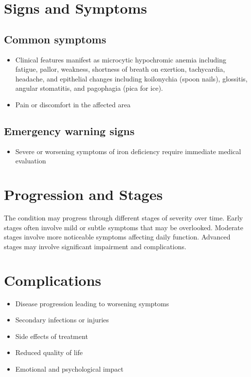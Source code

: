 \section{Signs and Symptoms}

\subsection{Common symptoms}
\begin{itemize}[noitemsep]
  \item Clinical features manifest as microcytic hypochromic anemia including fatigue, pallor, weakness, shortness of breath on exertion, tachycardia, headache, and epithelial changes including koilonychia (spoon nails), glossitis, angular stomatitis, and pagophagia (pica for ice).

  \item Pain or discomfort in the affected area
  \end{itemize}

\subsection{Emergency warning signs}
\begin{itemize}[noitemsep]
  \item Severe or worsening symptoms of iron deficiency require immediate medical evaluation
\end{itemize}
\section{Progression and Stages}
The condition may progress through different stages of severity over time. Early stages often involve mild or subtle symptoms that may be overlooked. Moderate stages involve more noticeable symptoms affecting daily function. Advanced stages may involve significant impairment and complications.
\section{Complications}
\begin{itemize}[noitemsep]
  \item Disease progression leading to worsening symptoms
  \item Secondary infections or injuries
  \item Side effects of treatment
  \item Reduced quality of life
  \item Emotional and psychological impact
\end{itemize}
